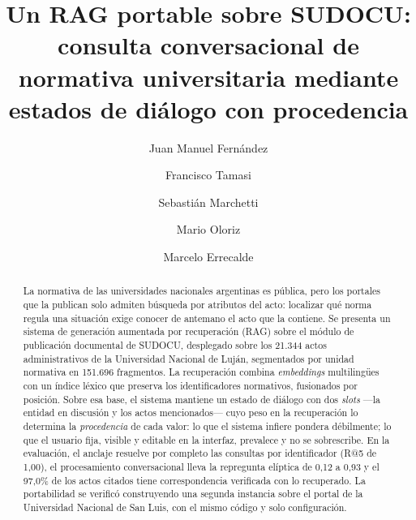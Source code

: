 \documentclass{llncs}
\begin{document}
\title{Un RAG portable sobre SUDOCU: consulta conversacional de normativa
universitaria mediante estados de diálogo con procedencia}

\author{Juan Manuel Fernández \and
        Francisco Tamasi \and
        Sebastián Marchetti \and
        Mario Oloriz \and
        Marcelo Errecalde}

\maketitle
\thispagestyle{empty}

\begin{abstract}
La normativa de las universidades nacionales argentinas es pública, pero los
portales que la publican solo admiten búsqueda por atributos del acto:
localizar qué norma regula una situación exige conocer de antemano el acto
que la contiene. Se presenta un sistema de generación aumentada por
recuperación (RAG) sobre el módulo de publicación documental de SUDOCU,
desplegado sobre los 21.344 actos administrativos de la Universidad Nacional de
Luján, segmentados por unidad normativa en 151.696 fragmentos. La
recuperación combina \emph{embeddings} multilingües con un índice léxico
que preserva los identificadores normativos, fusionados por posición. Sobre
esa base, el sistema mantiene un estado de diálogo con dos \emph{slots} ---la
entidad en discusión y los actos mencionados--- cuyo peso en la recuperación
lo determina la \emph{procedencia} de cada valor: lo que el sistema infiere
pondera débilmente; lo que el usuario fija, visible y editable en la interfaz,
prevalece y no se sobrescribe. En la evaluación, el anclaje resuelve por
completo las consultas por identificador (R@5 de 1{,}00), el procesamiento
conversacional lleva la repregunta elíptica de 0{,}12 a 0{,}93 y el 97{,}0\%
de los actos citados tiene correspondencia verificada con lo recuperado.
La portabilidad se verificó construyendo una segunda instancia sobre el portal
de la Universidad Nacional de San Luis, con el mismo código y solo
configuración.

\end{abstract}
\end{document}
